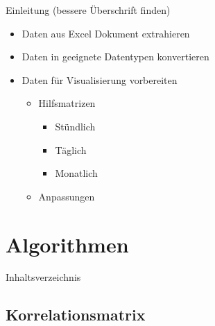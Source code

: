 \begin{frame}{Einleitung (bessere Überschrift finden)}
\begin{itemize}
	\item Daten aus Excel Dokument extrahieren
	\item Daten in geeignete Datentypen konvertieren
	\item Daten für Visualisierung vorbereiten
	\begin{itemize}
		\item Hilfsmatrizen
		\begin{itemize}
			\item Stündlich
			\item Täglich
			\item Monatlich
		\end{itemize}
		\item Anpassungen
	\end{itemize}
\end{itemize}
\end{frame}



\section{Algorithmen}
\begin{frame}{Inhaltsverzeichnis}
\tableofcontents[currentsection]
\end{frame}

\subsection{Korrelationsmatrix}
\begin{frame}{\insertsubsectionhead}
	

\end{frame}


